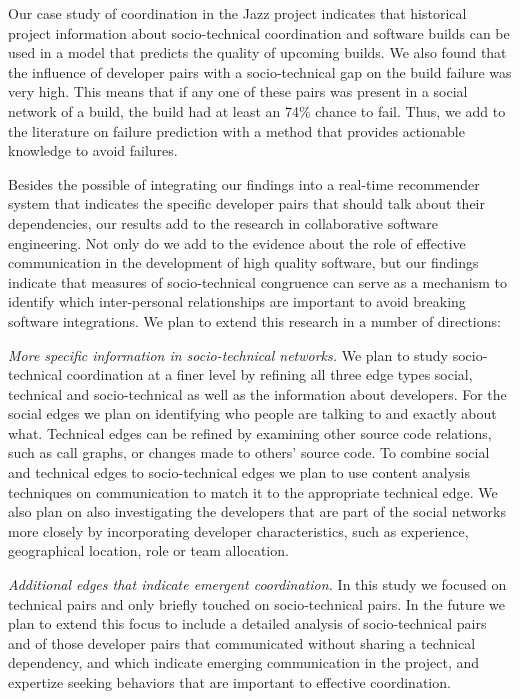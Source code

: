 Our case study of coordination in the Jazz project indicates that 
historical project information about socio-technical coordination and software
builds can be used in a model that predicts the quality of upcoming builds. We also found
that the influence of developer pairs with a socio-technical gap on the build
failure was very high. This means that if any one of these pairs was present in a
social network of a build, the build had at least an 74\% chance to fail.
Thus, we add to the literature on failure prediction with a method that
provides actionable knowledge to avoid failures. 

Besides the possible of integrating our findings into a real-time recommender system that indicates the specific developer pairs that should talk about their dependencies, our results add to the research in
collaborative software engineering. Not only do we add to the evidence about
the role of effective communication in the development of high quality
software, but our findings indicate that measures of socio-technical congruence can
serve as a mechanism to identify which inter-personal relationships are
important to avoid breaking software integrations. 
%
We plan to extend this research in a number of directions:

\emph{More specific information in socio-technical networks.}
We plan to study socio-technical coordination at a finer level by refining all
three edge types social, technical and socio-technical as well as the
information about developers. For the social edges we plan on identifying who
people are talking to and exactly about what. Technical edges can be refined by examining other source code relations, such as call
graphs, or changes made to others' source code. 
%
To combine social and technical
edges to socio-technical edges we plan to use content analysis techniques on
communication to match it to the appropriate technical edge. We also plan
on also investigating the developers that are part of the social networks more
closely by incorporating developer characteristics, such as experience,
geographical location, role or team allocation.

\emph{Additional edges that indicate emergent coordination.}
In this study we focused on technical pairs and only briefly touched on
socio-technical pairs. In the future we plan to extend this focus to include a
detailed analysis of socio-technical pairs and of those
developer pairs that communicated without sharing a technical dependency, and
which indicate emerging communication in the project, and expertize seeking
behaviors that are important to effective coordination.

